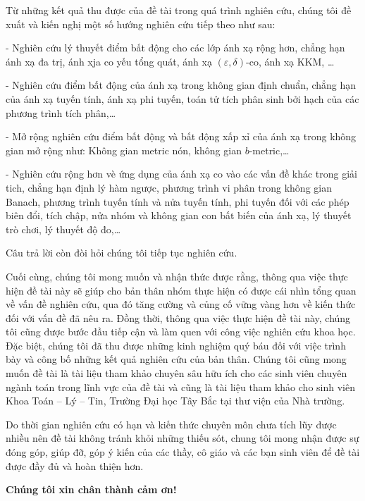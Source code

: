 
Từ những kết quả thu được của đề tài trong quá trình nghiên cứu, chúng tôi đề xuất và kiến nghị một số hướng nghiên cứu tiếp theo như sau: 

- Nghiên cứu lý thuyết điểm bất động cho các lớp ánh xạ rộng hơn, chẳng hạn ánh xạ đa trị, ánh xja co yếu tổng quát, ánh xạ $(\varepsilon, \delta)$-co, ánh xạ KKM, \ldots

- Nghiên cứu điểm bất động của ánh xạ trong không gian định chuẩn, chẳng hạn của ánh xạ tuyến tính, ánh xạ phi tuyến, toán tử tích phân sinh bởi hạch của các phương trình tích phân,\ldots

- Mở rộng nghiên cứu điểm bất động và bất động xấp xỉ của ánh xạ trong không gian mở rộng như: Không gian metric nón, không gian $b$-metric,\ldots

- Nghiên cứu rộng hơn vè ứng dụng của ánh xạ co vào các vấn đề khác trong giải tich, chẳng hạn định lý hàm ngược, phương trình vi phân trong không gian Banach, phương trình tuyến tính và nửa tuyến tính, phi tuyến đối với các phép biên đổi, tích chập, nửa nhóm và không gian con bất biến của ánh xạ, lý thuyết trò chơi, lý thuyết độ đo,\ldots 

Câu trả lời còn đòi hỏi chúng tôi tiếp tục nghiên cứu. 

Cuối cùng, chúng tôi mong muốn và nhận thức được rằng, thông qua việc thực hiện đề tài này sẽ giúp cho bản thân nhóm thực hiện có được cái nhìn tổng quan về vấn đề nghiên cứu, qua đó tăng cường và củng cố vững vàng hơn về kiến thức đối với vấn đề đã nêu ra. Đồng thời, thông qua việc thực hiện đề tài này, chúng tôi cũng được bước đầu tiếp cận và làm quen với công việc nghiên cứu khoa học. Đặc biệt, chúng tôi đã thu được những kinh nghiệm quý báu đối với việc trình bày và công bố những kết quả nghiên cứu của bản thân. Chúng tôi cũng mong muốn đề tài là tài liệu tham khảo chuyên sâu hữu ích cho các sinh viên chuyên ngành toán trong lĩnh vực của đề tài và cũng là tài liệu tham khảo cho sinh viên Khoa Toán – Lý – Tin, Trường Đại học Tây Bắc tại thư viện của Nhà trường.

Do thời gian nghiên cứu có hạn và kiến thức chuyên môn chưa tích lũy được nhiều nên đề tài không tránh khỏi những thiếu sót, chung tôi mong nhận được sự đóng góp, giúp đỡ, góp ý kiến của các thầy, cô giáo và các bạn sinh viên để đề tài được đầy đủ và hoàn thiện hơn.

\begin{center}
\textbf{Chúng tôi xin chân thành cảm ơn!}
\end{center}
 
 
